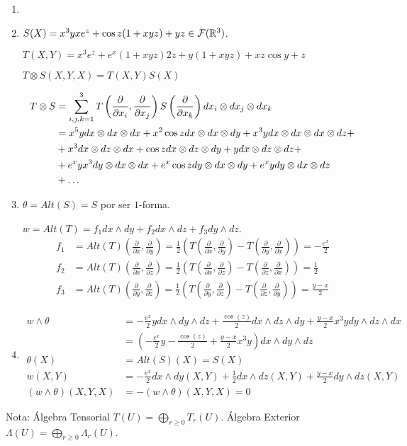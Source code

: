 \documentclass[twoside]{article}
\begin{document}
\begin{solucion}
\begin{enumerate}
\item[]

\item $S(X)=x^3yxe^z+\cos{z}(1+xyz)+yz\in\mathcal{F}(\mathbb{R}^3)$. 

$T(X,Y)=x^3e^z+e^x(1+xyz)2z+y(1+xyz)+xz\cos{y}+z$

$T\otimes S(X,Y,X)=T(X,Y)S(X)$

\begin{align*}
T\otimes S &= \sum_{i,j,k=1}^3T\left(\frac{\partial }{\partial x_i},\frac{\partial }{\partial x_j}\right)S\left(\frac{\partial }{\partial x_k}\right) dx_i\otimes dx_j\otimes dx_k \\
&=
x^5y dx\otimes dx \otimes dx + x^2\cos{z}dx\otimes dx\otimes dy + x^3y dx\otimes dx \otimes dx \otimes dz +\\
&+ x^3dx\otimes dz \otimes dx + \cos{z}dx\otimes dz \otimes dy + ydx\otimes dz \otimes dz+\\
&+ e^xyx^3 dy\otimes dx \otimes dx + e^x\cos{z}dy\otimes dx \otimes dy + e^xy dy\otimes dx \otimes dz \\
&+ \dotsc
\end{align*}
\item $\theta=Alt(S)=S$ por ser $1$-forma. 

$w= Alt(T)=f_1dx\land dy+f_2 dx\land dz + f_3 dy\land dz$.
\begin{align*}
f_1 &= Alt(T)\left(\frac{\partial}{\partial x},\frac{\partial}{\partial y}\right)=\frac{1}{2}\left(T\left(\frac{\partial}{\partial x},\frac{\partial}{\partial y}\right)-T\left(\frac{\partial}{\partial y},\frac{\partial}{\partial x}\right)\right)=-\frac{e^x}{2}\\
f_2 &= Alt(T)\left(\frac{\partial}{\partial x},\frac{\partial}{\partial z}\right)=\frac{1}{2}\left(T\left(\frac{\partial}{\partial x},\frac{\partial}{\partial z}\right)-T\left(\frac{\partial}{\partial z},\frac{\partial}{\partial x}\right)\right)=\frac{1}{2}\\
f_3 &= Alt(T)\left(\frac{\partial}{\partial y},\frac{\partial}{\partial z}\right)=\frac{1}{2}\left(T\left(\frac{\partial}{\partial y},\frac{\partial}{\partial z}\right)-T\left(\frac{\partial}{\partial z},\frac{\partial}{\partial y}\right)\right)=\frac{y-x}{2}
\end{align*}
\item 
\begin{align*}
w\land \theta &= -\frac{e^x}{2}y  dx\land dy \land dz +\frac{\cos(z)}{2}dx\land dz \land dy + \frac{y-x}{2}x^3 y dy\land dz \land dx\\
&=\left(-\frac{e^x}{2}y  -\frac{\cos(z)}{2} +  \frac{y-x}{2}x^3 y \right)dx\land dy \land dz\\
\theta(X)&=Alt(S)(X)=S(X)\\
w(X,Y)&= -\frac{e^x}{2}dx\land dy (X,Y) + \frac{1}{2} dx\land dz (X,Y) + \frac{y-x}{2} dy\land dz(X,Y)\\
(w\land \theta)(X,Y,X) & = -(w\land \theta)(X,Y,X) = 0
\end{align*}
\end{enumerate}
Nota: Álgebra Tensorial $T(U)=\bigoplus_{r\geq 0}T_r(U)$. Álgebra Exterior $\Lambda(U)=\bigoplus_{r\geq 0} \Lambda_r(U)$.
\end{solucion}
\end{document}
